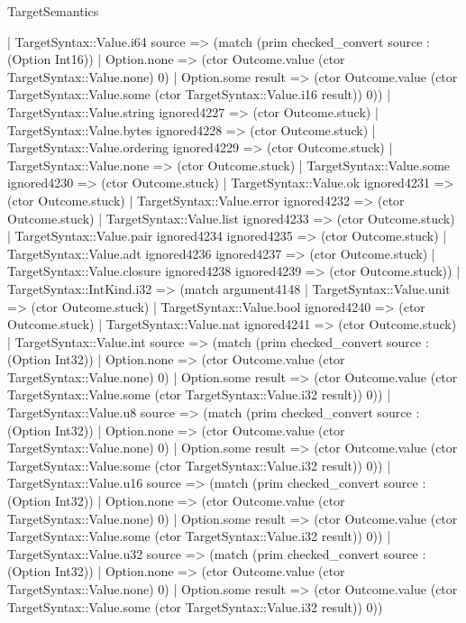 \begin{lexlean}{TargetSemantics}
\begin{semanticmodule}
{            | TargetSyntax::Value.i64 source => (match (prim checked_convert source : (Option Int16))
              | Option.none => (ctor Outcome.value (ctor TargetSyntax::Value.none) 0)
              | Option.some result => (ctor Outcome.value (ctor TargetSyntax::Value.some (ctor TargetSyntax::Value.i16 result)) 0))
            | TargetSyntax::Value.string ignored4227 => (ctor Outcome.stuck)
            | TargetSyntax::Value.bytes ignored4228 => (ctor Outcome.stuck)
            | TargetSyntax::Value.ordering ignored4229 => (ctor Outcome.stuck)
            | TargetSyntax::Value.none => (ctor Outcome.stuck)
            | TargetSyntax::Value.some ignored4230 => (ctor Outcome.stuck)
            | TargetSyntax::Value.ok ignored4231 => (ctor Outcome.stuck)
            | TargetSyntax::Value.error ignored4232 => (ctor Outcome.stuck)
            | TargetSyntax::Value.list ignored4233 => (ctor Outcome.stuck)
            | TargetSyntax::Value.pair ignored4234 ignored4235 => (ctor Outcome.stuck)
            | TargetSyntax::Value.adt ignored4236 ignored4237 => (ctor Outcome.stuck)
            | TargetSyntax::Value.closure ignored4238 ignored4239 => (ctor Outcome.stuck))
          | TargetSyntax::IntKind.i32 => (match argument4148
            | TargetSyntax::Value.unit => (ctor Outcome.stuck)
            | TargetSyntax::Value.bool ignored4240 => (ctor Outcome.stuck)
            | TargetSyntax::Value.nat ignored4241 => (ctor Outcome.stuck)
            | TargetSyntax::Value.int source => (match (prim checked_convert source : (Option Int32))
              | Option.none => (ctor Outcome.value (ctor TargetSyntax::Value.none) 0)
              | Option.some result => (ctor Outcome.value (ctor TargetSyntax::Value.some (ctor TargetSyntax::Value.i32 result)) 0))
            | TargetSyntax::Value.u8 source => (match (prim checked_convert source : (Option Int32))
              | Option.none => (ctor Outcome.value (ctor TargetSyntax::Value.none) 0)
              | Option.some result => (ctor Outcome.value (ctor TargetSyntax::Value.some (ctor TargetSyntax::Value.i32 result)) 0))
            | TargetSyntax::Value.u16 source => (match (prim checked_convert source : (Option Int32))
              | Option.none => (ctor Outcome.value (ctor TargetSyntax::Value.none) 0)
              | Option.some result => (ctor Outcome.value (ctor TargetSyntax::Value.some (ctor TargetSyntax::Value.i32 result)) 0))
            | TargetSyntax::Value.u32 source => (match (prim checked_convert source : (Option Int32))
              | Option.none => (ctor Outcome.value (ctor TargetSyntax::Value.none) 0)
              | Option.some result => (ctor Outcome.value (ctor TargetSyntax::Value.some (ctor TargetSyntax::Value.i32 result)) 0))
}
\end{semanticmodule}
\end{lexlean}
